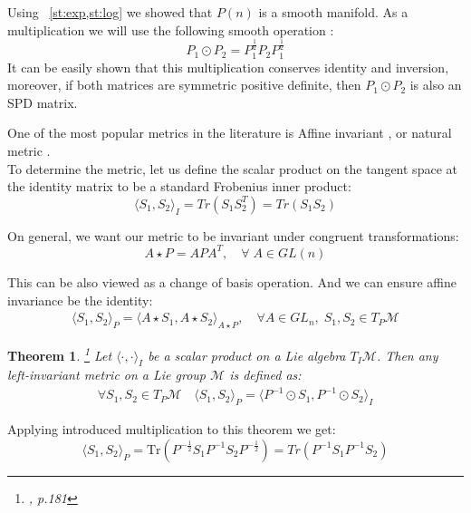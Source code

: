 \documentclass[12pt]{extarticle}
\newtheorem{theorem}{Theorem}[section]
\theoremstyle{definition}
\theoremstyle{remark}
\begin{document}
	Using ~\cref{st:exp,st:log}  we showed that $P(n)$ is a smooth manifold. As a multiplication we will use the following smooth operation \cite{Pennec2006}:
	\begin{equation*}
	P_1 \odot P_2 = P_1^{\frac12}P_2P_1^{\frac12}
	\end{equation*}
	It can be easily shown that this multiplication conserves identity and inversion, moreover, if both matrices are symmetric positive definite, then $P_1 \odot P_2$ is also an SPD matrix. 
	
	One of the most popular metrics in the literature is Affine invariant \cite{Forstner1999}, \cite{Pennec2006} or natural metric \cite{Faraut1995}. \\
	To determine the metric, let us define the scalar product on the tangent space at the identity matrix to be a standard Frobenius inner product:
	\begin{equation*}
	\langle S_1, S_2\rangle_I = Tr(S_1S_2^T) = Tr(S_1S_2)
	\end{equation*} 
	
	On general, we want our metric to be invariant under congruent transformations:
	\begin{equation*}
	A \star P = APA^T, \quad \forall \; A \in GL(n)
	\end{equation*}
	
	This can be also viewed as a change of basis operation. And we can ensure affine invariance be the identity:
	\begin{align}\label{eq:aff-inv}
	\langle  S_1, S_2 \rangle_P = \langle A\star S_1, A\star  S_2 \rangle_{A\star P}, \quad \forall A \in GL_n,\; S_1, S_2 \in T_P\mathcal{M}
	\end{align}
	
	\begin{theorem} \footnote{\cite{2005}, p.181}
		Let $  \langle \cdot , \cdot \rangle_I$ be a scalar product on a Lie algebra $T_I\mathcal{M}$. Then any left-invariant metric on a Lie group $\mathcal{M}$ is defined as:
		\begin{align*}
		\forall S_1, S_2 \in T_{P}\mathcal{M} \quad  \langle S_1, S_2\rangle_P =  \langle P^{-1}\odot S_1, P^{-1}\odot S_2\rangle_I  
		\end{align*}
	\end{theorem}
	
	Applying introduced multiplication to this theorem we get:
	\begin{equation}\label{eq:metric}
	\langle S_1, S_2\rangle_P = \text{Tr}(P^{-\frac12}S_1P^{-1}S_2P^{-\frac12}) = Tr(P^{-1}S_1P^{-1}S_2) 
	\end{equation}
	
\end{document}
